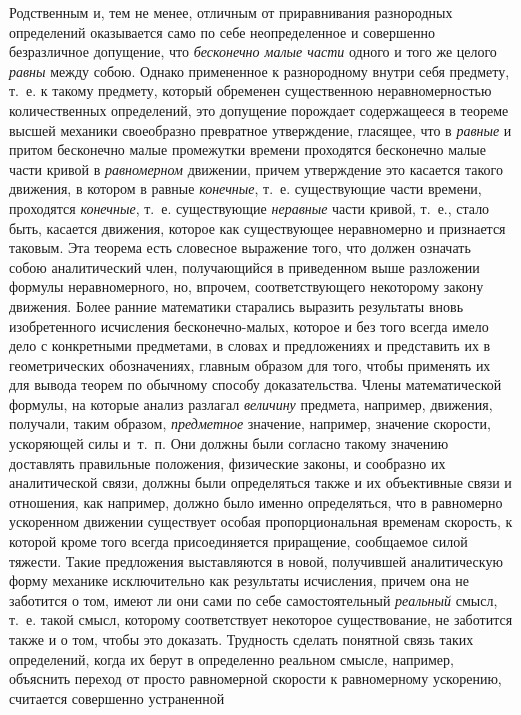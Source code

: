Родственным и, тем не менее, отличным от приравнивания разнородных определений
оказывается само по себе неопределенное и совершенно безразличное допущение,
что {\em бесконечно малые части} одного и того же целого {\em равны} между
собою. Однако примененное к разнородному внутри себя предмету, т.~е. к такому
предмету, который обременен существенною неравномерностью количественных
определений, это допущение порождает содержащееся в теореме высшей механики
своеобразно превратное утверждение, гласящее, что в {\em равные} и притом
бесконечно малые промежутки времени проходятся бесконечно малые части кривой в
{\em равномерном} движении, причем утверждение это касается такого движения, в
котором в равные {\em конечные}, т.~е. существующие части времени, проходятся
{\em конечные}, т.~е. существующие {\em неравные} части кривой, т.~е., стало
быть, касается движения, которое как существующее неравномерно и признается
таковым. Эта теорема есть словесное выражение того, что должен означать собою
аналитический член, получающийся в приведенном выше разложении формулы
неравномерного, но, впрочем, соответствующего некоторому закону движения. Более
ранние математики старались выразить результаты вновь изобретенного исчисления
бесконечно-малых, которое и без того всегда имело дело с конкретными
предметами, в словах и предложениях и представить их в геометрических
обозначениях, главным образом для того, чтобы применять их для вывода теорем по
обычному способу доказательства. Члены математической формулы, на которые
анализ разлагал {\em величину} предмета, например, движения, получали, таким
образом, {\em предметное} значение, например, значение скорости, ускоряющей
силы и~т.~п. Они должны были согласно такому значению доставлять правильные
положения, физические законы, и сообразно их аналитической связи, должны были
определяться также и их объективные связи и отношения, как например, должно
было именно определяться, что в равномерно ускоренном движении существует
особая пропорциональная временам скорость, к которой кроме того всегда
присоединяется приращение, сообщаемое силой тяжести. Такие предложения
выставляются в новой, получившей аналитическую форму механике исключительно как
результаты исчисления, причем она не заботится о том, имеют ли они сами по себе
самостоятельный {\em реальный} смысл, т.~е. такой смысл, которому соответствует
некоторое существование, не заботится также и о том, чтобы это доказать.
Трудность сделать понятной связь таких определений, когда их берут в
определенно реальном смысле, например, объяснить переход от просто равномерной
скорости к равномерному ускорению, считается совершенно устраненной
